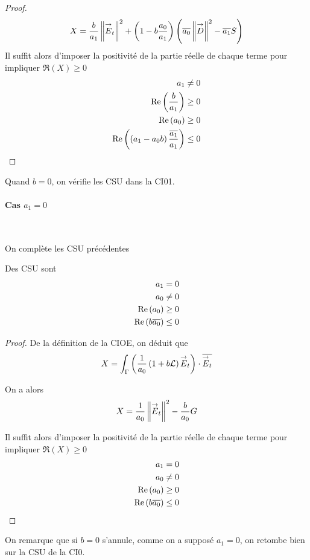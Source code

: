 \begin{proof}
          \begin{equation}
            \label{eq:unicite:form_var:decomp_cgu_ci1_a1}
            X = \dfrac{b}{a_1}\left\lVert{\overset{\rightarrow}{E}}_t\right\rVert^2  + \left(1-b\dfrac{a_0}{a_1}\right)\left({\overline{a_0}} \left\lVert{\overset{\rightarrow}{D}}\right\rVert^2 - {\overline{a_1}} S\right)
          \end{equation}
          Il suffit alors d'imposer la positivité de la partie réelle de chaque terme pour impliquer \(\Re(X)\ge0\)
          \begin{align}
            a_1 \not = 0\\
            \operatorname{Re}\left(\dfrac{b}{a_1}\right) \ge 0 \\
            \operatorname{Re}\left(a_0\right) \ge 0 \\
            \operatorname{Re}\left(\left(a_1-a_0 b\right)\dfrac{{\overline{a_1}}}{a_1}\right) \le 0
          \end{align}
        \end{proof}

        Quand \(b=0\), on vérifie les CSU dans la CI01.%

      \paragraph{Cas \(a_1=0\)}
        ~
        
        On complète les CSU précédentes
        \begin{prop}
          Des CSU sont
          \begin{align}
            a_1 = 0 \\
            a_0 \not= 0\\
            \operatorname{Re}\left(a_0\right) \ge 0\\
            \operatorname{Re}\left(b{\overline{a_0}}\right) \le 0
          \end{align}
        \end{prop}
        \begin{proof}
          De la définition de la CIOE, on déduit que
          \[
            X = \int_\Gamma \left( \dfrac{1}{a_0}\left(1+b\mathcal{L}\right){\overset{\rightarrow}{E}}_t\right) \cdot {\overline{{\overset{\rightarrow}{E}}_t}} 
          \]

          On a alors
          \begin{equation}
            \label{eq:unicite:form_var:decomp_cgu_ci1_a1_nul}
            X = \dfrac{1}{a_0}\left\lVert{\overset{\rightarrow}{E}}_t\right\rVert^2  - \dfrac{b}{a_0}G
          \end{equation}

          Il suffit alors d'imposer la positivité de la partie réelle de chaque terme pour impliquer \(\Re(X)\ge0\)
          \begin{align}
            a_1 = 0 \\
            a_0 \not= 0\\
            \operatorname{Re}\left(a_0\right) \ge 0\\
            \operatorname{Re}\left(b{\overline{a_0}}\right) \le 0
          \end{align}
        \end{proof}

        On remarque que si \(b=0\) s’annule, comme on a supposé \(a_1=0\), on retombe bien sur la CSU de la CI0.


